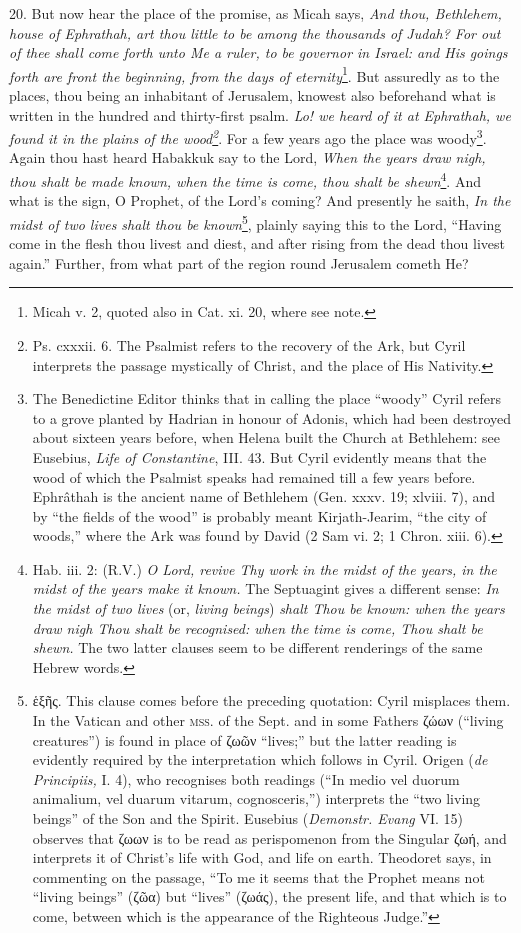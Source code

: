 20. But now hear the place of the promise, as Micah says, \emph{And thou, Bethlehem, house of Ephrathah, art thou little to be among the thousands of Judah? For out of thee shall come forth unto Me a ruler, to be governor in Israel: and His goings forth are front the beginning, from the days of eternity}\footnote{Micah v. 2, quoted also in Cat. xi. 20, where see note.}. But assuredly as to the places, thou being an inhabitant of Jerusalem, knowest also beforehand what is written in the hundred and thirty-first psalm. \emph{Lo! we heard of it at Ephrathah, we found it in the plains of the wood\footnote{Ps. cxxxii. 6. The Psalmist refers to the recovery of the Ark, but Cyril interprets the passage mystically of Christ, and the place of His Nativity.}}. For a few years ago the place was woody\footnote{The Benedictine Editor thinks that in calling the place “woody” Cyril refers to a grove planted by Hadrian in honour of Adonis, which had been destroyed about sixteen years before, when Helena built the Church at Bethlehem: see Eusebius, \emph{Life of Constantine}, III. 43. But Cyril evidently means that the wood of which the Psalmist speaks had remained till a few years before. Ephrâthah is the ancient name of Bethlehem (Gen. xxxv. 19; xlviii. 7), and by “the fields of the wood” is probably meant Kirjath-Jearim, “the city of woods,” where the Ark was found by David (2 Sam vi. 2; 1 Chron. xiii. 6).}. Again thou hast heard Habakkuk say to the Lord, \emph{When the years draw nigh, thou shalt be made known, when the time is come, thou shalt be shewn}\footnote{Hab. iii. 2: (R.V.) \emph{O Lord, revive Thy work in the midst of the years, in the midst of the years make it known.} The Septuagint gives a different sense: \emph{In the midst of two lives} (or, \emph{living beings}) \emph{shalt Thou be known: when the years draw nigh Thou shalt be recognised: when the time is come, Thou shalt be shewn.} The two latter clauses seem to be different renderings of the same Hebrew words.}. And what is the sign, O Prophet, of the Lord’s coming? And presently he saith, \emph{In the midst of two lives shalt thou be known}\footnote{\textgreek{ἑξῆς}. This clause comes before the preceding quotation: Cyril misplaces them. In the Vatican and other \textsc{mss.} of the Sept. and in some Fathers \textgreek{ζώων} (“living creatures”) is found in place of \textgreek{ζωῶν} “lives;” but the latter reading is evidently required by the interpretation which follows in Cyril. Origen (\emph{de Principiis,} I. 4), who recognises both readings (“In medio vel duorum animalium, vel duarum vitarum, cognosceris,”) interprets the “two living beings” of the Son and the Spirit. Eusebius (\emph{Demonstr. Evang} VI. 15) observes that \textgreek{ζωων} is to be read as perispomenon from the Singular \textgreek{ζωή}, and interprets it of Christ’s life with God, and life on earth. Theodoret says, in commenting on the passage, “To me it seems that the Prophet means not “living beings” (\textgreek{ζῶα}) but “lives” (\textgreek{ζωάς}), the present life, and that which is to come, between which is the appearance of the Righteous Judge.”}, plainly saying this to the Lord, “Having come in the flesh thou livest and diest, and after rising from the dead thou livest again.” Further, from what part of the region round Jerusalem cometh He? 